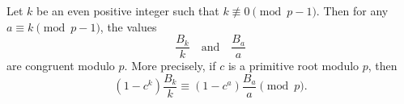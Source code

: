 Let $k$ be an even positive integer such that $k \not\equiv 0 \pmod{p-1}$. Then for any $a \equiv k \pmod{p-1}$, the values
$$
\frac{B_k}{k} \quad \text{and} \quad \frac{B_a}{a}
$$
are congruent modulo $p$. More precisely, if $c$ is a primitive root modulo $p$, then
$$
(1 - c^k)\frac{B_k}{k} \equiv (1 - c^a)\frac{B_a}{a} \pmod{p}.
$$
